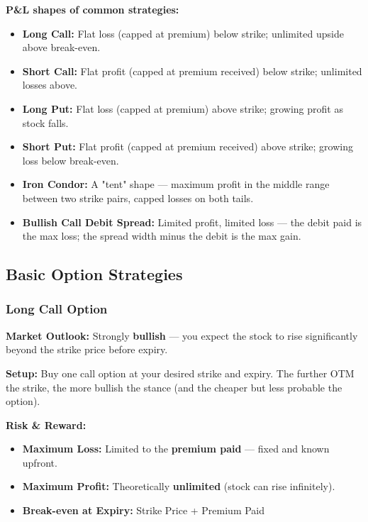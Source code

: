 \documentclass[12pt,openany]{book}
\begin{document}
\textbf{P\&L shapes of common strategies:}
\begin{itemize}[leftmargin=*]
    \item \textbf{Long Call:} Flat loss (capped at premium) below strike; unlimited upside above break-even.
    \item \textbf{Short Call:} Flat profit (capped at premium received) below strike; unlimited losses above.
    \item \textbf{Long Put:} Flat loss (capped at premium) above strike; growing profit as stock falls.
    \item \textbf{Short Put:} Flat profit (capped at premium received) above strike; growing loss below break-even.
    \item \textbf{Iron Condor:} A "tent" shape — maximum profit in the middle range between two strike pairs, capped losses on both tails.
    \item \textbf{Bullish Call Debit Spread:} Limited profit, limited loss — the debit paid is the max loss; the spread width minus the debit is the max gain.
\end{itemize}

\subsection{Basic Option Strategies}

\subsubsection{Long Call Option}

\textbf{Market Outlook:} Strongly \textbf{bullish} — you expect the stock to rise significantly beyond the strike price before expiry.

\textbf{Setup:} Buy one call option at your desired strike and expiry. The further OTM the strike, the more bullish the stance (and the cheaper but less probable the option).

\textbf{Risk \& Reward:}
\begin{itemize}[leftmargin=*]
    \item \textbf{Maximum Loss:} Limited to the \textbf{premium paid} — fixed and known upfront.
    \item \textbf{Maximum Profit:} Theoretically \textbf{unlimited} (stock can rise infinitely).
    \item \textbf{Break-even at Expiry:} Strike Price + Premium Paid
\end{itemize}
\end{document}
